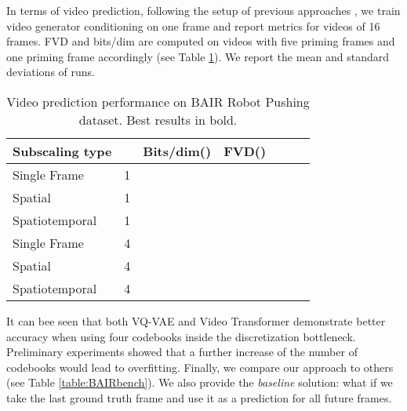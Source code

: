 \documentclass{article}
\begin{document}
In terms of video prediction, following the setup of previous approaches \cite{vt, dvdgan, dvdgan2}, we train video generator conditioning on one frame and report metrics for videos of 16 frames. FVD and bits/dim are computed on videos with five priming frames and one priming frame accordingly (see Table \ref{table:BAIRvt}). We report the mean and standard deviations of  runs.

\begin{table}[!hbtp]
\centering
\caption{Video prediction performance on BAIR Robot Pushing dataset. Best results in bold.}
\begin{tabular}{lllcccc}
\hline
\textbf{Subscaling type} &  & \textbf{Bits/dim}() & \textbf{FVD}() \\ \hline
Single Frame & 1 &  &  \\
Spatial & 1 &  &  \\
Spatiotemporal & 1 &  &  \\ \hline
Single Frame & 4 &  &  \\
Spatial & 4 &  &  \\
Spatiotemporal & 4 &  &  \\ \hline
\end{tabular}
\label{table:BAIRvt}
\end{table}

It can bee seen that both VQ-VAE and Video Transformer demonstrate better accuracy when using four codebooks inside the discretization bottleneck. Preliminary experiments showed that a further increase of the number of codebooks would lead to overfitting. Finally, we compare our approach to others (see Table \ref{table:BAIRbench}). We also provide the \textit{baseline} solution: what if we take the last ground truth frame and use it as a prediction for all future frames.
\end{document}
